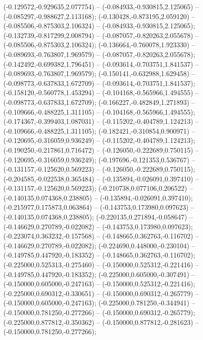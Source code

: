  (-0.129572,-0.929635,2.077754) -- (-0.084933,-0.930815,2.125065) -- (-0.085297,-0.988627,2.113168);
 (-0.130428,-0.873195,2.059120) -- (-0.085506,-0.875303,2.106324) -- (-0.084933,-0.930815,2.125065);
 (-0.132739,-0.817299,2.008794) -- (-0.087057,-0.820263,2.055678) -- (-0.085506,-0.875303,2.106324);
 (-0.136664,-0.760078,1.923330) -- (-0.089693,-0.763807,1.969579) -- (-0.087057,-0.820263,2.055678);
 (-0.142492,-0.699382,1.796451) -- (-0.093614,-0.703751,1.841537) -- (-0.089693,-0.763807,1.969579);
 (-0.150141,-0.632988,1.629458) -- (-0.098773,-0.637833,1.672709) -- (-0.093614,-0.703751,1.841537);
 (-0.158120,-0.560778,1.453294) -- (-0.104168,-0.565966,1.494555) -- (-0.098773,-0.637833,1.672709);
 (-0.166227,-0.482849,1.271893) -- (-0.109666,-0.488225,1.311105) -- (-0.104168,-0.565966,1.494555);
 (-0.174367,-0.399403,1.087031) -- (-0.115202,-0.404789,1.124213) -- (-0.109666,-0.488225,1.311105);
 (-0.182421,-0.310854,0.900971) -- (-0.120695,-0.316059,0.936249) -- (-0.115202,-0.404789,1.124213);
 (-0.190250,-0.217861,0.716472) -- (-0.126050,-0.222689,0.750115) -- (-0.120695,-0.316059,0.936249);
 (-0.197696,-0.121353,0.536767) -- (-0.131157,-0.125620,0.569223) -- (-0.126050,-0.222689,0.750115);
 (-0.204585,-0.022538,0.365484) -- (-0.135894,-0.026091,0.397410) -- (-0.131157,-0.125620,0.569223);
 (-0.210738,0.077106,0.206522) -- (-0.140135,0.074368,0.238805) -- (-0.135894,-0.026091,0.397410);
 (-0.215977,0.175873,0.063864) -- (-0.143753,0.173980,0.097623) -- (-0.140135,0.074368,0.238805);
 (-0.220135,0.271894,-0.058647) -- (-0.146629,0.270789,-0.022082) -- (-0.143753,0.173980,0.097623);
 (-0.223074,0.363232,-0.157568) -- (-0.148665,0.362763,-0.116702) -- (-0.146629,0.270789,-0.022082);
 (-0.224690,0.448000,-0.230104) -- (-0.149785,0.447920,-0.183352) -- (-0.148665,0.362763,-0.116702);
 (-0.225000,0.525313,-0.275460) -- (-0.150000,0.525312,-0.221416) -- (-0.149785,0.447920,-0.183352);
 (-0.225000,0.605000,-0.307491) -- (-0.150000,0.605000,-0.247163) -- (-0.150000,0.525312,-0.221416);
 (-0.225000,0.690312,-0.330651) -- (-0.150000,0.690312,-0.265779) -- (-0.150000,0.605000,-0.247163);
 (-0.225000,0.781250,-0.344941) -- (-0.150000,0.781250,-0.277266) -- (-0.150000,0.690312,-0.265779);
 (-0.225000,0.877812,-0.350362) -- (-0.150000,0.877812,-0.281623) -- (-0.150000,0.781250,-0.277266);
